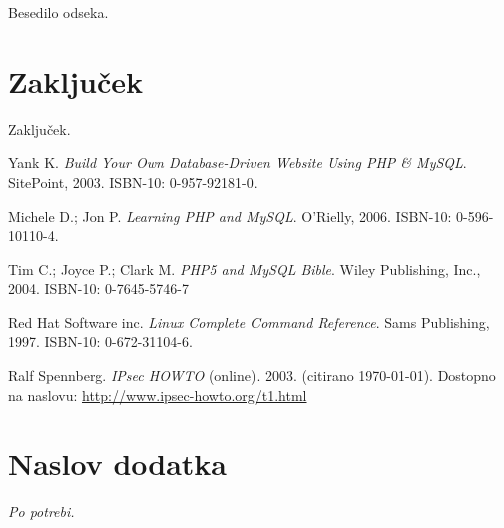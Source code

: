 \documentclass[a4paper,12pt]{report}
\begin{document}
Besedilo odseka.

\chapter{Zaključek}

Zaključek.

\begin{thebibliography}{99}
\addtocounter{chapter}{1}

 Yank K. \emph{Build Your Own Database-Driven Website Using PHP \& MySQL}. SitePoint, 2003. ISBN-10: 0-957-92181-0.

 Michele D.; Jon P. \emph{Learning PHP and MySQL}. O'Rielly, 2006. ISBN-10: 0-596-10110-4.

 Tim C.; Joyce P.; Clark M. \emph{PHP5 and MySQL Bible}. Wiley Publishing, Inc., 2004. ISBN-10: 0-7645-5746-7

 Red Hat Software inc. \emph{Linux Complete Command Reference}. Sams Publishing, 1997. ISBN-10: 0-672-31104-6.

 Ralf Spennberg. \emph{IPsec HOWTO} (online). 2003. (citirano \today). Dostopno na naslovu:
\url{http://www.ipsec-howto.org/t1.html}

\end{thebibliography}


 \appendix

\chapter{Naslov dodatka}
{\it Po potrebi.}
\end{document}
